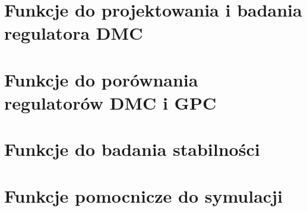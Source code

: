 \documentclass[a4paper,titlepage,11pt,floatssmall]{mwrep}
\begin{document}


\section{Funkcje do projektowania i badania regulatora DMC}





\section{Funkcje do porównania regulatorów DMC i GPC}



\section{Funkcje do badania stabilności}





\section{Funkcje pomocnicze do symulacji}




\end{document}
